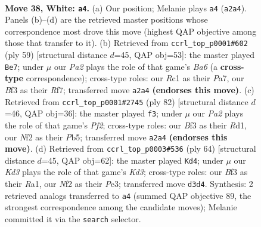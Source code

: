 \documentclass[11pt]{article}
\begin{document}
\clearpage

\begin{figure}[p]\centering
\begin{subfigure}{0.46\textwidth}\centering
\resizebox{\linewidth}{!}{%
\newchessgame
\chessboard[
  setfen={3r1k2/3b1p1p/1p6/p2p2r1/6P1/1P1K1B2/P4N1P/2R3R1 w - - 0 38},
  showmover=false,
  pgfstyle=straightmove, color=movearrow, markmove={a2-a4}
]}
\caption{}
\end{subfigure}\hfill
\begin{subfigure}{0.46\textwidth}\centering
\resizebox{\linewidth}{!}{%
\newchessgame
\chessboard[
  setfen={7k/pr3rp1/8/4BP1p/3p3P/bP3P2/P2R4/1K5R b - - 2 30},
  showmover=false,
  pgfstyle=straightmove, color=movearrow, markmove={a3-e7}
]}
\caption{}
\end{subfigure}
\\[4pt]
\begin{subfigure}{0.46\textwidth}\centering
\resizebox{\linewidth}{!}{%
\newchessgame
\chessboard[
  setfen={2r4k/8/6pp/1PP1r3/3pp1P1/3p3P/5P2/2RR2K1 w - - 3 42},
  showmover=false,
  pgfstyle=straightmove, color=movearrow, markmove={f2-f3}
]}
\caption{}
\end{subfigure}\hfill
\begin{subfigure}{0.46\textwidth}\centering
\resizebox{\linewidth}{!}{%
\newchessgame
\chessboard[
  setfen={1r3k2/rP3p1p/6p1/3p4/p5PP/3KPP2/8/RR6 w - - 1 33},
  showmover=false,
  pgfstyle=straightmove, color=movearrow, markmove={d3-d4}
]}
\caption{}
\end{subfigure}
\caption{\textbf{Move 38, White: \texttt{a4}.} (a) Our position; Melanie plays \texttt{a4} (\texttt{a2a4}). Panels (b)--(d) are the retrieved master positions whose correspondence most drove this move (highest QAP objective among those that transfer to it). (b) Retrieved from \texttt{ccrl\_top\_p0001\#602} (ply 59) [structural distance $d$=45, QAP obj=53]: the master played \texttt{Be7}; under $\mu$ our \emph{Pa2} plays the role of that game's \emph{Ba6} (a \textbf{cross-type} correspondence); cross-type roles: our \emph{R}c1 as their \emph{P}a7, our \emph{B}f3 as their \emph{R}f7; transferred move \texttt{a2a4} \textbf{(endorses this move)}. (c) Retrieved from \texttt{ccrl\_top\_p0001\#2745} (ply 82) [structural distance $d$=46, QAP obj=36]: the master played \texttt{f3}; under $\mu$ our \emph{Pa2} plays the role of that game's \emph{Pf2}; cross-type roles: our \emph{B}f3 as their \emph{R}d1, our \emph{N}f2 as their \emph{P}b5; transferred move \texttt{a2a4} \textbf{(endorses this move)}. (d) Retrieved from \texttt{ccrl\_top\_p0003\#536} (ply 64) [structural distance $d$=45, QAP obj=62]: the master played \texttt{Kd4}; under $\mu$ our \emph{Kd3} plays the role of that game's \emph{Kd3}; cross-type roles: our \emph{B}f3 as their \emph{R}a1, our \emph{N}f2 as their \emph{P}e3; transferred move \texttt{d3d4}. Synthesis: 2 retrieved analogs transferred to \texttt{a4} (summed QAP objective 89, the strongest correspondence among the candidate moves); Melanie committed it via the \texttt{search} selector.}
\label{fig:thought-m74}
\end{figure}
\end{document}

